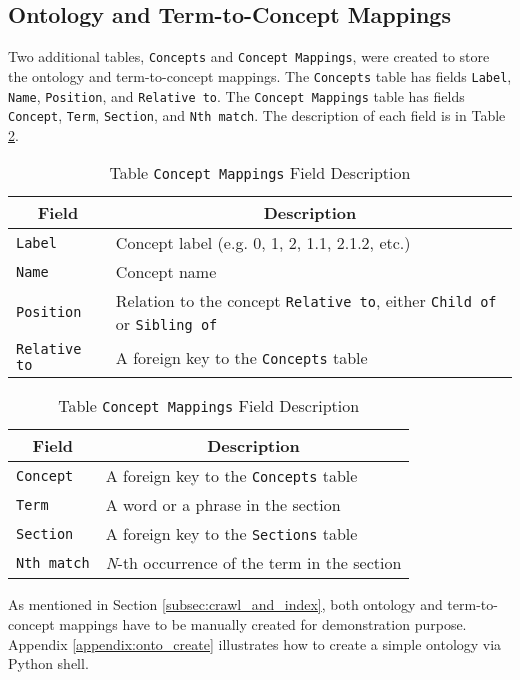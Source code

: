 \subsection{Ontology and Term-to-Concept Mappings}
Two additional tables, \texttt{Concepts} and \texttt{Concept Mappings}, were created to store the ontology and term-to-concept mappings. The \texttt{Concepts} table has fields \texttt{Label}, \texttt{Name}, \texttt{Position}, and \texttt{Relative to}. The \texttt{Concept Mappings} table has fields \texttt{Concept}, \texttt{Term}, \texttt{Section}, and \texttt{Nth match}. The description of each field is in Table \ref{tbl:onto_and_map}.

\begin{table}[!htbp]
\begingroup
\renewcommand{\arraystretch}{1.2}
\caption{Field Description for Ontology and Concept Mappings}
\label{tbl:onto_and_map}

\begin{subtable}{\textwidth}
\centering
\caption{Table \texttt{Concepts} Field Description}
\begin{tabular}{p{3cm} p{9cm}}
\toprule
\multicolumn{1}{c}{\textbf{Field}} & \multicolumn{1}{c}{\textbf{Description}} \\
\midrule
\texttt{Label} & Concept label (e.g. 0, 1, 2, 1.1, 2.1.2, etc.) \\
\texttt{Name} & Concept name \\
\texttt{Position} & Relation to the concept \texttt{Relative to}, either \texttt{Child of} or \texttt{Sibling of}  \\
\texttt{Relative to} & A foreign key to the \texttt{Concepts} table \\
\bottomrule       
\end{tabular}
\end{subtable}

\begin{subtable}{\textwidth}
\centering
\caption{Table \texttt{Concept Mappings} Field Description}
\begin{tabular}{p{3cm} p{9cm}}
\toprule
\multicolumn{1}{c}{\textbf{Field}} & \multicolumn{1}{c}{\textbf{Description}} \\
\midrule
\texttt{Concept} & A foreign key to the \texttt{Concepts} table \\
\texttt{Term} & A word or a phrase in the section \\
\texttt{Section} &A foreign key to the \texttt{Sections} table \\
\texttt{Nth match} & \textit{N}-th occurrence of the term in the section\\
\bottomrule       
\end{tabular}
\end{subtable}

\endgroup
\end{table}

As mentioned in Section \ref{subsec:crawl_and_index}, both ontology and term-to-concept mappings have to be manually created for demonstration purpose. Appendix \ref{appendix:onto_create} illustrates how to create a simple ontology via Python shell.

